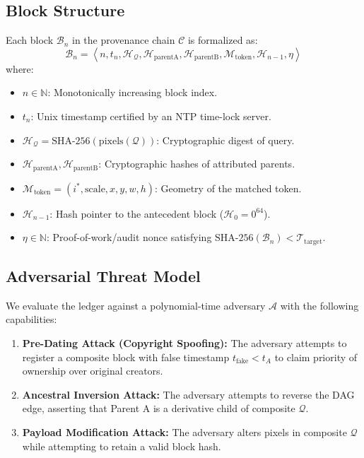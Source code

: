 \documentclass[journal]{IEEEtran}
\begin{document}
\subsection{Block Structure}
Each block $\mathcal{B}_n$ in the provenance chain $\mathcal{C}$ is formalized as:
\begin{equation}
\mathcal{B}_n = \left\langle n, t_n, \mathcal{H}_{\mathcal{Q}}, \mathcal{H}_{\text{parentA}}, \mathcal{H}_{\text{parentB}}, \mathcal{M}_{\text{token}}, \mathcal{H}_{n-1}, \eta \right\rangle
\end{equation}
where:
\begin{itemize}
    \item $n \in \mathbb{N}$: Monotonically increasing block index.
    \item $t_n$: Unix timestamp certified by an NTP time-lock server.
    \item $\mathcal{H}_{\mathcal{Q}} = \text{SHA-256}(\text{pixels}(\mathcal{Q}))$: Cryptographic digest of query.
    \item $\mathcal{H}_{\text{parentA}}, \mathcal{H}_{\text{parentB}}$: Cryptographic hashes of attributed parents.
    \item $\mathcal{M}_{\text{token}} = (i^*, \text{scale}, x, y, w, h)$: Geometry of the matched token.
    \item $\mathcal{H}_{n-1}$: Hash pointer to the antecedent block ($\mathcal{H}_0 = 0^{64}$).
    \item $\eta \in \mathbb{N}$: Proof-of-work/audit nonce satisfying $\text{SHA-256}(\mathcal{B}_n) < \mathcal{T}_{\text{target}}$.
\end{itemize}

\subsection{Adversarial Threat Model}
We evaluate the ledger against a polynomial-time adversary $\mathcal{A}$ with the following capabilities:
\begin{enumerate}
    \item \textbf{Pre-Dating Attack (Copyright Spoofing):} The adversary attempts to register a composite block with false timestamp $t_{\text{fake}} < t_A$ to claim priority of ownership over original creators.
    \item \textbf{Ancestral Inversion Attack:} The adversary attempts to reverse the DAG edge, asserting that Parent A is a derivative child of composite $\mathcal{Q}$.
    \item \textbf{Payload Modification Attack:} The adversary alters pixels in composite $\mathcal{Q}$ while attempting to retain a valid block hash.
\end{enumerate}
\end{document}
